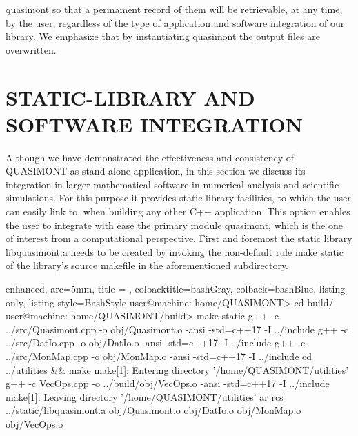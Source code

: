 \documentclass[a4paper, twosided]{book}
\begin{document}
\colorbox{poliGrayBlue}{quasimont} so that a permament record of them will be retrievable, at any time, by the user, regardless of the type of application and software integration of our library. We emphasize that by instantiating \colorbox{poliGrayBlue}{quasimont} the output files are overwritten.

\section[Static-library and software integration]{\changefont STATIC-LIBRARY AND SOFTWARE INTEGRATION}\label{Sec3.3}

\noindent
Although we have demonstrated the effectiveness and consistency of QUASIMONT as stand-alone application, in this section we discuss its integration in larger mathematical software in numerical analysis and scientific simulations. For this purpose it provides static library facilities, to which the user can easily link to, when building any other C++ application. This option enables the user to integrate with ease the primary module \colorbox{poliGrayBlue}{quasimont}, which is the one of interest from a computational perspective. First and foremost the static library \colorbox{poliGrayBlue}{libquasimont.a} needs to be created by invoking the non-default rule \colorbox{poliGrayBlue}{make static} of the library's source \colorbox{poliGrayBlue}{makefile} in the aforementioned subdirectory.

\vspace{0.5cm}
\begin{tcblisting}{enhanced,
                   arc=5mm,
                   title = \color{black}{\large \ttfamily Creation of libquasimont static library},
                   colbacktitle=bashGray,
                   colback=bashBlue,
                   listing only,
                   listing style=BashStyle}
user@machine: home/QUASIMONT> cd build/
user@machine: home/QUASIMONT/build> make static
g++ -c ../src/Quasimont.cpp -o obj/Quasimont.o -ansi -std=c++17 -I ../include 
g++ -c ../src/DatIo.cpp -o obj/DatIo.o -ansi -std=c++17 -I ../include 
g++ -c ../src/MonMap.cpp -o obj/MonMap.o -ansi -std=c++17 -I ../include 
cd ../utilities && make
make[1]: Entering directory '/home/QUASIMONT/utilities'
g++ -c VecOps.cpp -o ../build/obj/VecOps.o -ansi -std=c++17 -I ../include 
make[1]: Leaving directory '/home/QUASIMONT/utilities'
ar rcs ../static/libquasimont.a obj/Quasimont.o obj/DatIo.o obj/MonMap.o obj/VecOps.o
\end{tcblisting}
\vspace{0.5cm}
\end{document}
